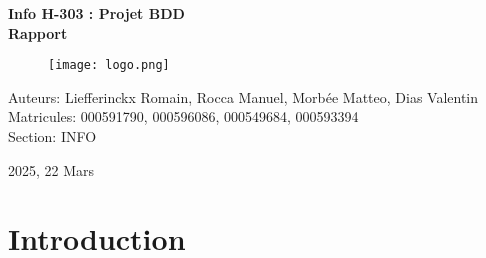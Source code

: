 \documentclass[utf8]{article}
\begin{document}
\begin{titlepage}
    \centering
    
    \vspace*{1cm}
    {\huge \bfseries Info H-303 : Projet BDD\\
                    Rapport \par}
    
    \vfill
    
    \begin{figure}[h]
        \centering
        \texttt{[image: logo.png]}
    \end{figure}
    
    \vfill
    
    {\large Auteurs: Liefferinckx Romain, Rocca Manuel, Morbée Matteo, Dias Valentin\\ 
            Matricules: 000591790, 000596086, 000549684, 000593394 \\ 
            Section: INFO \par}
    {\large 2025, 22 Mars \par}
\end{titlepage}

\newpage
\tableofcontents

\newpage


\section{Introduction}
\end{document}

